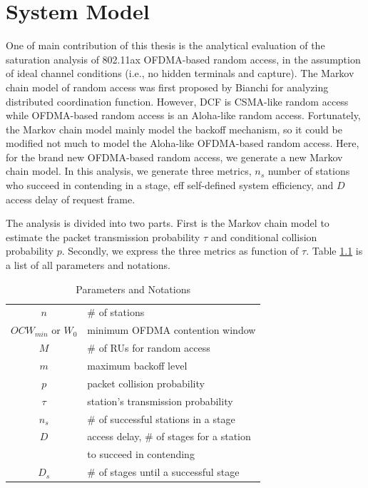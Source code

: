 	\chapter{System Model} 		\label{chp_sys_model}
One of main contribution of this thesis is the analytical evaluation of the saturation analysis of 802.11ax OFDMA-based random access, in the assumption of ideal channel conditions (i.e., no hidden terminals and capture). 
The Markov chain model of random access was first proposed by Bianchi for analyzing distributed coordination function\cite{bianchi2000performance}. 
However, DCF is CSMA-like random access while OFDMA-based random access is an Aloha-like random access.
Fortunately, the Markov chain model mainly model the backoff mechanism, so it could be modified not much to model the Aloha-like OFDMA-based random access.
Here, for the brand new OFDMA-based random access, we generate a new Markov chain model. 
In this analysis, we generate three metrics, $n_s$ number of stations who succeed in contending in a stage, eff self-defined system efficiency, and $D$ access delay of request frame. 

The analysis is divided into two parts. First is the Markov chain model to estimate the packet transmission probability $\tau$ and conditional collision probability $p$. 
Secondly, we express the three metrics as function of $\tau$. 
Table \ref{table_notation} is a list of all parameters and notations.

\begin{table}[!b]
\caption{Parameters and Notations}
\centering
\label{table_notation}
\begin{tabular}{c|l}
\hline
$n$						& $\#$ of stations \\
$OCW_{min}$ or $W_0$		& minimum OFDMA contention window \\
$M$						& $\#$ of RUs for random access \\
$m$						& maximum backoff level \\
$p$						& packet collision probability \\
$\tau$					& station's transmission probability \\
$n_s$					& $\#$ of successful stations in a stage \\
$D$			            & access delay, $\#$ of stages for a station \\ & to succeed in contending \\
$D_s$					& $\#$ of stages until a successful stage \\
\hline
\end{tabular}
\end{table}

